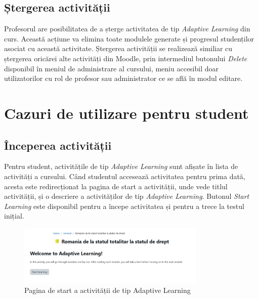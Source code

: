 \subsection{Ștergerea activității}
Profesorul are posibilitatea de a șterge activitatea de tip \textit{Adaptive Learning} din curs. Această acțiune va elimina toate modulele generate și progresul studenților asociat cu
această activitate. Ștergerea activității se realizează similiar cu ștergerea oricărei alte activități din Moodle, prin intermediul butonului \textit{Delete} disponibil în meniul de 
administrare al cursului, meniu accesibil doar utilizatorilor cu rol de profesor sau administrator ce se află în modul editare.

\section{Cazuri de utilizare pentru student}
\subsection{Începerea activității}
Pentru student, activitățile de tip \textit{Adaptive Learning} sunt afișate în lista de activități a cursului. Când studentul accesează activitatea pentru prima dată, acesta este 
redirecționat la pagina de start a activității, unde vede titlul activității, și o descriere a activităților de tip \textit{Adaptive Learning}. Butonul \textit{Start Learning} este 
disponibil pentru a începe activitatea și pentru a trece la testul inițial.
\begin{figure}[H]
    \centering
    \includegraphics[width=0.8\textwidth]{images/startPage.png}
    \caption{Pagina de start a activității de tip Adaptive Learning}
    \label{fig:pagina_start}
\end{figure}

